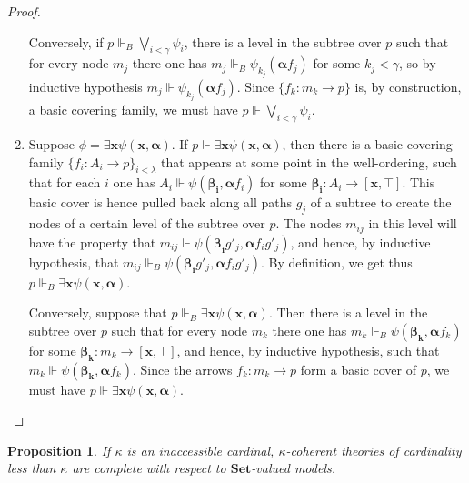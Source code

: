 \documentclass[a4paper,11pt]{article}
\theoremstyle{plain}
\newtheorem{proposition}[thm]{Proposition}
\theoremstyle{plain}
\theoremstyle{remark}
\newcommand{\Sets}{\ensuremath{\mathbf{Set}}}
\begin{document}
\begin{proof}
\begin{enumerate}
  Conversely, if $p \Vdash_B \bigvee_{i<\gamma} \psi_i$, there is a level in the subtree over $p$ such that for every node $m_j$ there one has $m_j \Vdash_B \psi_{k_j}(\boldsymbol{\alpha} f_j)$ for some $k_j<\gamma$, so by inductive hypothesis $m_j \Vdash \psi_{k_j}(\boldsymbol{\alpha} f_j)$. Since $\{f_k: m_k \to p\}$ is, by construction, a basic covering family, we must have $p \Vdash \bigvee_{i<\gamma} \psi_i$.
   
  \item Suppose $\phi=\exists \mathbf{x} \psi(\mathbf{x}, \boldsymbol{\alpha})$. If $p \Vdash \exists \mathbf{x} \psi(\mathbf{x}, \boldsymbol{\alpha})$, then there is a basic covering family $\{f_i: A_i \to p\}_{i<\lambda}$ that appears at some point in the well-ordering, such that for each $i$ one has $A_i \Vdash \psi(\boldsymbol{\beta_i}, \boldsymbol{\alpha} f_i)$ for some $\boldsymbol{\beta_i}: A_i \to [\mathbf{x}, \top]$. This basic cover is hence pulled back along all paths $g_j$ of a subtree to create the nodes of a certain level of the subtree over $p$. The nodes $m_{ij}$ in this level will have the property that $m_{ij} \Vdash \psi(\boldsymbol{\beta_i}g'_j, \boldsymbol{\alpha} f_ig'_j)$, and hence, by inductive hypothesis, that $m_{ij} \Vdash_B \psi(\boldsymbol{\beta_i}g'_j, \boldsymbol{\alpha} f_ig'_j)$. By definition, we get thus $p \Vdash_B \exists \mathbf{x} \psi(\mathbf{x}, \boldsymbol{\alpha})$.
  
  Conversely, suppose that $p \Vdash_B \exists \mathbf{x} \psi(\mathbf{x}, \boldsymbol{\alpha})$. Then there is a level in the subtree over $p$ such that for every node $m_k$ there one has $m_k \Vdash_B \psi(\boldsymbol{\beta_k}, \boldsymbol{\alpha} f_k)$ for some $\boldsymbol{\beta_k}: m_k \to [\mathbf{x}, \top]$, and hence, by inductive hypothesis, such that $m_k \Vdash \psi(\boldsymbol{\beta_k}, \boldsymbol{\alpha} f_k)$. Since the arrows $f_k: m_k \to p$ form a basic cover of $p$, we must have $p \Vdash \exists \mathbf{x} \psi(\mathbf{x}, \boldsymbol{\alpha})$.
  
  \end{enumerate}
 
\end{proof}

\begin{proposition}\label{cohcomp}
If $\kappa$ is an inaccessible cardinal, $\kappa$-coherent theories of cardinality less than $\kappa$ are complete with respect to \Sets-valued models.
\end{proposition}
\end{document}
